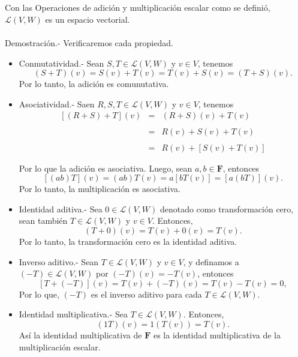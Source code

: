 \begin{myteo}\,\\\\
    Con las Operaciones de adición y multiplicación escalar como se definió, $\mathcal{L}\left(V,W\right)$ es un espacio vectorial.\\\\
	Demostración.-\; Verificaremos cada propiedad.

	\begin{itemize}

	    \item Conmutatividad.- Sean $S,T\in \mathcal{L}(V,W)$ y $v\in V$, tenemos
		$$(S+T)(v)=S(v)+T(v)=T(v)+S(v)=(T+S)(v).$$
		Por lo tanto, la adición es comunutativa.\\

	    \item Asociatividad.- Saen $R,S,T\in \mathcal{L}(V,W)$ y $v\in V$, tenemos
		$$
		\begin{array}{rcl}
		    \left[(R+S)+T\right](v) &=& (R+S)(v)+T(v)\\\\
					    &=& R(v)+S(v)+T(v)\\\\
					    &=& R(v)+\left[S(v)+T(v)\right]\\\\
		\end{array}
		$$
		Por lo que la adición es asociativa. Luego, sean $a,b\in \textbf{F}$, entonces
		$$\left[(ab)T\right](v)=(ab)T(v)=a\left[bT(v)\right]=\left[a(bT)\right](v).$$
		Por lo tanto, la multiplicación es asociativa.\\

	    \item Identidad aditiva.- Sea $0\in \mathcal{L}(V,W)$ denotado como transformación cero, sean también $T\in \mathcal{L}(V,W)$ y $v\in V$. Entonces,
		$$(T+0)(v)=T(v)+0(v)=T(v).$$
		Por lo tanto, la transformación cero es la identidad aditiva.\\

	    \item Inverso aditivo.- Sean $T\in \mathcal{L}(V,W)$ y $v\in V$, y definamos a $(-T)\in \mathcal{L}(V,W)$ por $(-T)(v)=-T(v)$, entonces
		$$\left[T+(-T)\right](v)=T(v)+(-T)(v)=T(v)-T(v)=0,$$
		Por lo que, $(-T)$ es el inverso aditivo para cada $T\in \mathcal{L}(V,W)$.\\

	    \item Identidad multiplicativa.- Sea $T\in \mathcal{L}(V,W)$. Entonces,
		$$(1T)(v)=1(T(v))=T(v).$$
		Así la identidad multiplicativa de $\textbf{F}$ es la identidad multiplicativa de la multiplicación escalar.\\


\end{itemize}
\end{myteo}
